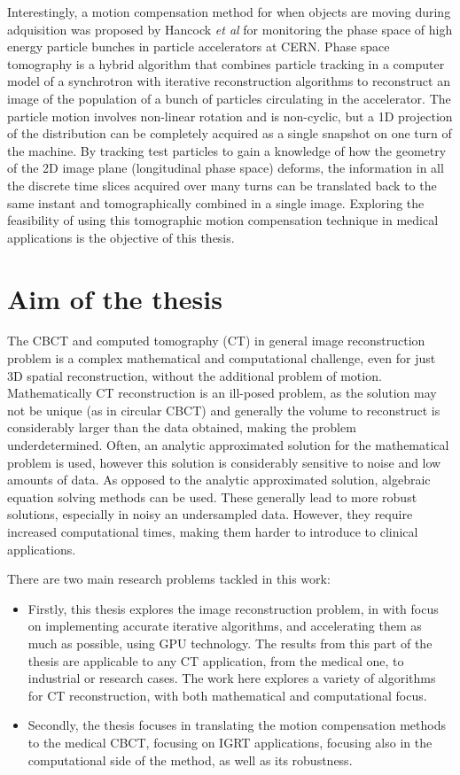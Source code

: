 Interestingly, a motion compensation method for when objects are moving during adquisition was proposed by Hancock \textit{et al}\cite{pst1}\cite{pst2}\cite{pstweb} for monitoring the phase space of high energy particle bunches in particle accelerators at CERN. Phase space tomography is a hybrid algorithm that combines particle tracking in a computer model of a synchrotron with iterative reconstruction algorithms to reconstruct an image of the population of a bunch of particles circulating in the accelerator. The particle motion involves non-linear rotation and is non-cyclic, but a 1D projection of the distribution can be completely acquired as a single snapshot on one turn of the machine. By tracking test particles to gain a knowledge of how the geometry of the 2D image plane (longitudinal phase space) deforms, the information in all the discrete time slices acquired over many turns can be translated back to the same instant and tomographically combined in a single image.  Exploring the feasibility of using this tomographic motion compensation technique in medical applications is the objective of this thesis.



\section{Aim of the thesis}

The CBCT and computed tomography (CT) in general image reconstruction problem is a complex mathematical and computational challenge, even for just 3D spatial reconstruction, without the additional problem of motion. Mathematically CT reconstruction is an ill-posed problem, as the solution may not be unique (as in circular CBCT) and generally the volume to reconstruct is considerably larger than the  data obtained, making the problem underdetermined. Often, an analytic approximated solution for the  mathematical problem is used, however this solution is considerably sensitive to noise and low amounts of data. As opposed to the analytic approximated solution, algebraic equation solving methods can be used. These generally lead to more robust solutions, especially in noisy an undersampled data. However, they require increased computational times, making them harder to introduce to clinical applications.

There are two main research problems tackled in this work:
\begin{itemize}
\item Firstly, this thesis explores the image reconstruction problem, in with focus on implementing accurate iterative algorithms, and accelerating them as much as possible, using GPU technology. The results from this part of the thesis are applicable to any CT application, from the medical one, to industrial or research cases. The work here explores a variety of algorithms for CT reconstruction, with both mathematical and computational focus.
\item Secondly, the thesis focuses in translating the motion compensation methods to the medical CBCT, focusing on IGRT applications, focusing also in the computational side of the method, as well as its robustness.
\end{itemize}

